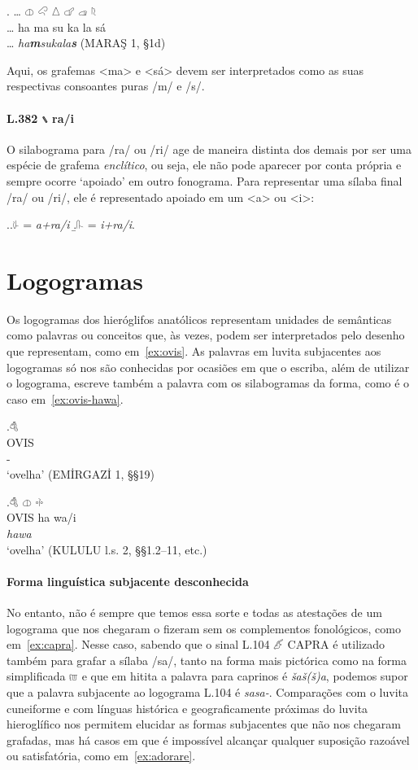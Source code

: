 \exg. \ldots{} \Large 𔓷 \Large 𔒅 \Large 𔖢 \Large 𔗧 \Large 𔓊 \Large 𔗦\\
\ldots{} ha ma su ka la sá\\
\ldots{} \emph{ha\textbf{m}sukala\textbf{s}} (MARAŞ 1, §1d)

Aqui, os grafemas <ma> e <sá> devem ser interpretados como as suas respectivas
consoantes puras /m/ e /s/.

\paragraph{L.382 𔖲 ra\slash{}i} O silabograma para /ra/ ou /ri/ age de maneira
distinta dos demais por ser uma espécie de grafema \emph{enclítico}, ou seja,
ele não pode aparecer por conta própria e sempre ocorre `apoiado' em outro
fonograma.
Para representar uma sílaba final /ra/ ou /ri/, ele é representado apoiado em um
<a> ou <i>:

\ex.\a.{\Large 𔗸} = \emph{a+ra\slash{}i}
\b.{\Large 𔓰} = \emph{i+ra\slash{}i}.


\section{Logogramas}

Os logogramas dos hieróglifos anatólicos representam unidades de semânticas
como palavras ou conceitos que, às vezes, podem ser interpretados pelo
desenho que representam, como em~\ref{ex:ovis}.
As palavras em luvita subjacentes aos logogramas só nos são conhecidas por
ocasiões em que o escriba, além de utilizar o logograma, escreve também a
palavra com os silabogramas da forma, como é o caso em~\ref{ex:ovis-hawa}.

\exg.\label{ex:ovis}\Large 𔒇\\
OVIS\\
-\\
`ovelha' (EMİRGAZİ 1, §§19)

\exg.\label{ex:ovis-hawa}\Large 𔒇 \Large 𔓷 \Large 𔗬\\
OVIS ha wa/i\\
\emph{hawa}\\
`ovelha' (KULULU l.s. 2, §§1.2–11, etc.)


\paragraph{Forma linguística subjacente desconhecida}
No entanto, não é sempre que temos essa sorte e todas as atestações de um
logograma que nos chegaram o fizeram sem os complementos fonológicos, como
em~\ref{ex:capra}. Nesse caso, sabendo que o sinal L.104 𔑶 CAPRA é utilizado
também para grafar a sílaba /sa/, tanto na forma mais pictórica como na forma
simplificada 𔑷 e que em hitita a palavra para caprinos é \emph{šaš{(š)}a}, podemos
supor que a palavra subjacente ao logograma L.104 é \emph{sasa-}.
Comparações com o luvita cuneiforme e com línguas histórica e
geograficamente próximas do luvita hieroglífico nos permitem elucidar as formas
subjacentes que não nos chegaram grafadas, mas há casos em que é impossível
alcançar qualquer suposição razoável ou satisfatória, como em~\ref{ex:adorare}.

